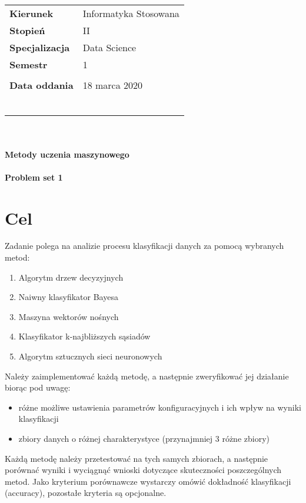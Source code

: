 \documentclass[a4paper,11pt]{article}
\begin{document}
\begin{titlepage}
\\~\\~\\~\\ 

\begin{tabular}{ll}
\LARGE{\textbf{Kierunek}}& \LARGE{Informatyka Stosowana} \\
\LARGE{\textbf{Stopień}}& \LARGE{II} \\
\LARGE{\textbf{Specjalizacja}}& \LARGE{Data Science} \\
\LARGE{\textbf{Semestr}}& \LARGE{1} \\\\
\LARGE{\textbf{Data oddania}}& \LARGE{18 marca 2020} \\\\\\\\\\\\\\
\end{tabular}

\begin{center}
\textbf{\huge{\\~\\Metody uczenia maszynowego }}
\textbf{\Huge{\\~\\Problem set 1}}
\end{center}

\end{titlepage}

\setcounter{page}{2}

\tableofcontents
\newpage

\section{Cel}
Zadanie polega na analizie procesu klasyfikacji danych za pomocą wybranych metod:
\begin{enumerate}
    \item Algorytm drzew decyzyjnych
    \item Naiwny klasyfikator Bayesa
    \item Maszyna wektorów nośnych
    \item Klasyfikator k-najbliższych sąsiadów
    \item Algorytm sztucznych sieci neuronowych
\end{enumerate}

Należy zaimplementować każdą metodę, a następnie zweryfikować jej działanie biorąc pod uwagę:
\begin{itemize}
    \item różne możliwe ustawienia parametrów konfiguracyjnych i ich wpływ na wyniki klasyfikacji
    \item zbiory danych o różnej charakterystyce (przynajmniej 3 różne zbiory)
\end{itemize}
Każdą metodę należy przetestować na tych samych zbiorach, a następnie porównać wyniki i wyciągnąć wnioski dotyczące skuteczności poszczególnych metod. Jako kryterium porównawcze wystarczy omówić dokładność klasyfikacji (accuracy), pozostałe kryteria są opcjonalne.
\end{document}
